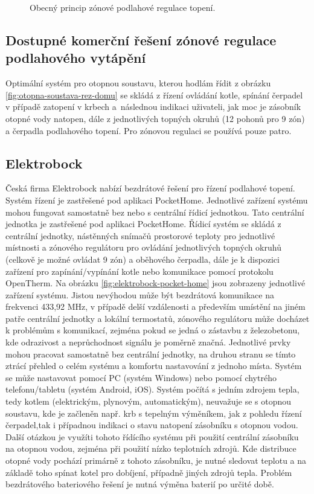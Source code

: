 \begin{figure}[H]
    \centering
    \def\svgwidth{\columnwidth}
    
    \caption{ Obecný princip zónové podlahové regulace topení.}
    \label{fig:obecny-princip-zonove-regulace}
\end{figure}




\subsection{Dostupné komerční řešení zónové regulace podlahového vytápění}

Optimální systém pro otopnou soustavu, kterou hodlám řídit z obrázku \ref{fig:otopna-soustava-rez-domu} se skládá z řízení ovládání kotle, spínání čerpadel v případě zatopení v krbech a~následnou indikaci uživateli, jak moc je zásobník otopné vody natopen, dále z jednotlivých topných okruhů (12 pohonů pro 9 zón) a čerpadla podlahového topení. Pro zónovou regulaci se používá pouze patro.

\subsection{Elektrobock}
Česká firma Elektrobock nabízí bezdrátové řešení pro řízení podlahové topení. Systém řízení je zastřešené pod aplikaci PocketHome. Jednotlivé zařízení systému mohou fungovat samostatně bez nebo s centrální řídicí jednotkou. Tato centrální jednotka je zastřešené pod aplikaci PocketHome. Řídicí systém se skládá z centrální jednotky, nástěnných snímačů prostorové teploty pro jednotlivé místnosti a zónového regulátoru pro ovládání jednotlivých topných okruhů (celkově je možné ovládat 9 zón) a oběhového čerpadla, dále je k dispozici zařízení pro zapínání/vypínání kotle nebo komunikace pomocí protokolu OpenTherm. Na obrázku \ref{fig:elektrobock-pocket-home} jsou zobrazeny jednotlivé zařízení systému. Jistou nevýhodou může být bezdrátová komunikace na frekvenci 433,92 MHz, v případě delší vzdálenosti a především umístění na jiném patře centrální jednotky a lokální termostatů, zónového regulátoru může docházet k problémům s komunikací, zejména pokud se jedná o zástavbu z železobetonu, kde odrazivost a neprůchodnost signálu je poměrně značná. Jednotlivé prvky mohou pracovat samostatně bez centrální jednotky, na druhou stranu se tímto ztrácí přehled o celém systému a komfortu nastavování z jednoho místa. Systém se může nastavovat pomocí PC (systém Windows) nebo pomocí chytrého telefonu/tabletu (systém Android, iOS). Systém počítá s jedním zdrojem tepla, tedy kotlem (elektrickým, plynovým, automatickým), neuvažuje se s otopnou soustavu, kde je začleněn např. krb s tepelným výměníkem, jak z pohledu řízení čerpadel,tak i případnou indikaci o stavu natopení zásobníku s otopnou vodou. Další otázkou je využíti tohoto řídícího systému při použití centrální zásobníku na otopnou vodou, zejména při použití nízko teplotních zdrojů. Kde distribuce otopné vody pochází primárně z tohoto zásobníku, je nutné sledovat teplotu  a na základě toho spínat kotel pro dobíjení, případně jiných zdrojů tepla. Problém bezdrátového bateriového řešení je nutná výměna baterií po určité době.


